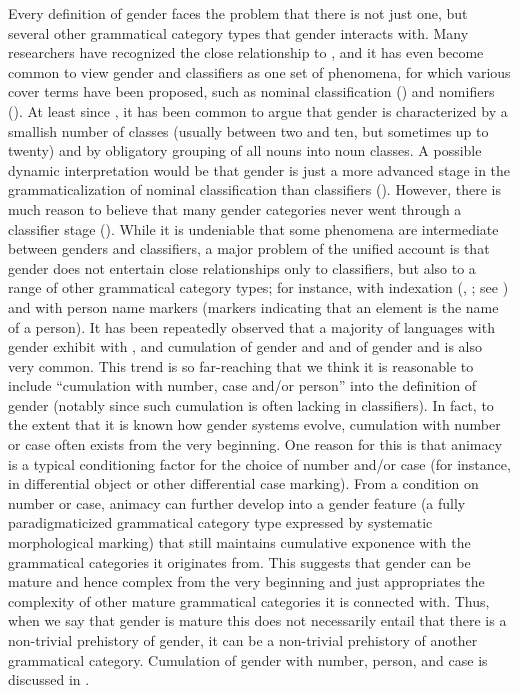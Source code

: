 \documentclass[output=collectionpaper]{langsci/langscibook}
\begin{document}
Every definition of gender faces the problem that there is not just one, but several other grammatical category types that gender interacts with. Many researchers have recognized the close relationship to , and it has even become common to view gender and classifiers as one set of phenomena, for which various cover terms have been proposed, such as nominal classification (\citealt{Seifart2010}) and nomifiers (\citealt{Haspelmath2018}). At least since \cite[160]{Dixon1982}, it has been common to argue that gender is characterized by a smallish number of classes (usually between two and ten, but sometimes up to twenty) and by obligatory grouping of all nouns into noun classes. A possible dynamic interpretation would be that gender is just a more advanced stage in the grammaticalization of nominal classification than classifiers (\citealt{Passer2016b}). However, there is much reason to believe that many gender categories never went through a classifier stage (\citealt[142]{Nichols1992}). While it is undeniable that some phenomena are intermediate between genders and classifiers, a major problem of the unified account is that gender does not entertain close relationships only to classifiers, but also to a range of other grammatical category types; for instance, with indexation (\citealt{Croft2003}, \citealt{Croft2013}; see ) and with person name markers (markers indicating that an element is the name of a person). It has been repeatedly observed that a majority of languages with gender exhibit  with , and cumulation of gender and  and of gender and  is also very common. This trend is so far-reaching that we think it is reasonable to include ``cumulation with number, case and/or person'' into the definition of gender (notably since such cumulation is often lacking in classifiers). In fact, to the extent that it is known how gender systems evolve, cumulation with number or case often exists from the very beginning. One reason for this is that animacy is a typical conditioning factor for the choice of number and/or case (for instance, in differential object or other differential case marking). From a condition on number or case, animacy can further develop into a gender feature (a fully paradigmaticized grammatical category type expressed by systematic morphological marking) that still maintains cumulative exponence with the grammatical categories it originates from. This suggests that gender can be mature and hence complex from the very beginning and just appropriates the complexity of other mature grammatical categories it is connected with. Thus, when we say that gender is mature this does not necessarily entail that there is a non-trivial prehistory of gender, it can be a non-trivial prehistory of another grammatical category. Cumulation of gender with number, person, and case is discussed in .
\end{document}
